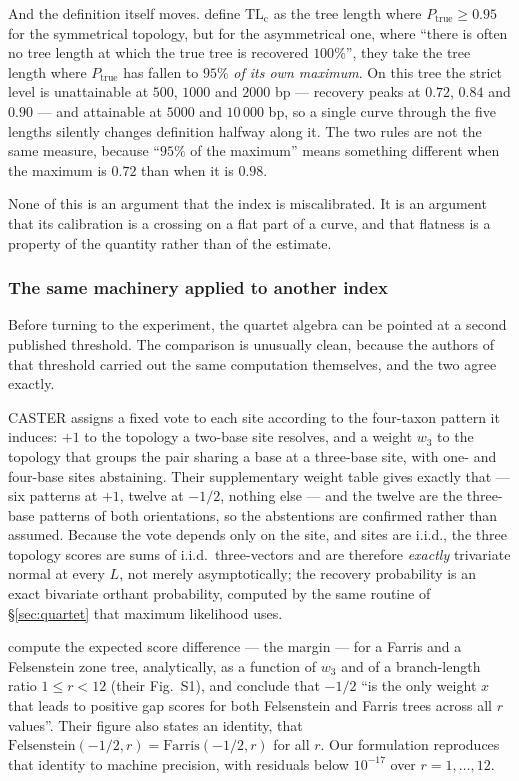 \documentclass[preprint,12pt,authoryear]{elsarticle}
\theoremstyle{definition}
\theoremstyle{remark}
\begin{document}
And the definition itself moves. \citet{xia2003iss} define $\mathrm{TL_c}$ as
the tree length where $P_{\text{true}}\ge0.95$ for the symmetrical topology,
but for the asymmetrical one, where ``there is often no tree length at which
the true tree is recovered $100\%$'', they take the tree length where
$P_{\text{true}}$ has fallen to $95\%$ \emph{of its own maximum}. On this
tree the strict level is unattainable at $500$, $1000$ and $2000$ bp ---
recovery peaks at $0.72$, $0.84$ and $0.90$ --- and attainable at $5000$ and
$10\,000$ bp, so a single curve through the five lengths silently changes
definition halfway along it. The two rules are not the same measure, because
``$95\%$ of the maximum'' means something different when the maximum is
$0.72$ than when it is $0.98$.

None of this is an argument that the index is miscalibrated. It is an
argument that its calibration is a crossing on a flat part of a curve, and
that flatness is a property of the quantity rather than of the estimate.

\subsubsection{The same machinery applied to another index}
\label{sec:w3}

Before turning to the experiment, the quartet algebra can be pointed at a
second published threshold. The comparison is unusually clean, because the
authors of that threshold carried out the same computation themselves, and
the two agree exactly.

CASTER assigns a fixed vote to each site according to the four-taxon pattern
it induces: $+1$ to the topology a two-base site resolves, and a weight $w_3$
to the topology that groups the pair sharing a base at a three-base site,
with one- and four-base sites abstaining. Their supplementary weight table
gives exactly that --- six patterns at $+1$, twelve at $-1/2$, nothing else
--- and the twelve are the three-base patterns of both orientations, so the
abstentions are confirmed rather than assumed. Because the vote depends only
on the site, and sites are i.i.d., the three topology scores are sums of
i.i.d.\ three-vectors and are therefore \emph{exactly} trivariate normal at
every $L$, not merely asymptotically; the recovery probability is an exact
bivariate orthant probability, computed by the same routine of
\S\ref{sec:quartet} that maximum likelihood uses.

\citet{zhang2025caster} compute the expected score difference --- the margin
--- for a Farris and a Felsenstein zone tree, analytically, as a function of
$w_3$ and of a branch-length ratio $1\le r<12$ (their Fig.~S1), and conclude
that $-1/2$ ``is the only weight $x$ that leads to positive gap scores for
both Felsenstein and Farris trees across all $r$ values''. Their figure also
states an identity, that $\text{Felsenstein}(-1/2,r)=\text{Farris}(-1/2,r)$
for all $r$. Our formulation reproduces that identity to machine precision,
with residuals below $10^{-17}$ over $r=1,\dots,12$.
\end{document}
